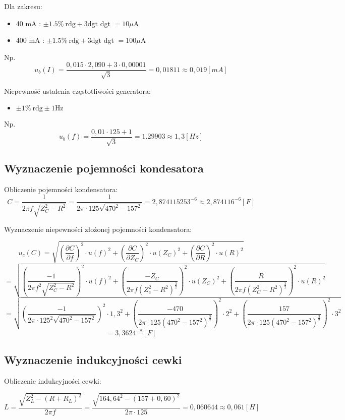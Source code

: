 \documentclass[12pt]{article}
\newcommand{\dpartial}[2]{\frac{\partial #1}{\partial #2}}
\newcommand{\physdpartial}[2]{\left( \dpartial{#1}{#2} \right)^2}
\newcommand{\powfrac}[2]{\left( \frac{#1}{#2} \right)^2}
\newcommand{\powsq}[1]{\left( #1 \right)^{\frac{3}{2}}}
\begin{document}
Dla zakresu:
\begin{itemize}
    \item 40 mA : $ \pm 1.5\% \ \textrm{rdg} + 3\textrm{dgt} $ \quad dgt $=10\mu$A
    \item 400 mA : $ \pm 1.5\% \ \textrm{rdg} + 3\textrm{dgt} $ \quad dgt $=100\mu$A
\end{itemize}

Np. 
$$ u_b(I) = \frac{0,015 \cdot 2,090 + 3 \cdot 0,00001}{\sqrt3} = 0,01811 \approx 0,019[mA]$$\bigskip

Niepewność ustalenia częstotliwości generatora:
\begin{itemize}
    \item $ \pm 1\% \ \textrm{rdg} \pm 1 \textrm{Hz} $
\end{itemize}

Np.
$$ u_b(f) = \frac{0,01 \cdot 125 + 1}{\sqrt{3}} = 1.29903 \approx 1,3[Hz] $$ 

\subsection{Wyznaczenie pojemności kondesatora}

Obliczenie pojemności kondensatora:
$$ C = \frac{1}{2 \pi f \sqrt{Z_C^2 - R^2}} = \frac{1}{2 \pi \cdot 125 \sqrt{470^2 - 157^2}} = 2,874115253^{-6} \approx 2,874116^{-6}[F] $$

Wyznaczenie niepewności złożonej pojemności kondensatora:

$$ u_c(C) = \sqrt{ \physdpartial{C}{f} \cdot u(f)^2 + \physdpartial{C}{Z_C} \cdot u(Z_C)^2 + \physdpartial{C}{R} \cdot u(R)^2 } $$
$$ = \sqrt{ \powfrac{-1}{2 \pi f^2 \sqrt{Z_C^2 - R^2}} \cdot u(f)^2 + \powfrac{-Z_C}{2 \pi f \powsq{Z_c^2 - R^2} } \cdot u(Z_C)^2 + \powfrac{R}{2 \pi f \powsq{Z_C^2 - R^2}} \cdot u(R)^2 } $$
$$ = \sqrt{ \powfrac{-1}{2 \pi \cdot 125^2 \sqrt{470^2 - 157^2}} \cdot 1,3^2 + \powfrac{-470}{2 \pi \cdot 125 \powsq{470^2 - 157^2} } \cdot 2^2 + \powfrac{157}{2\pi \cdot 125 \powsq{470^2 - 157^2} } \cdot 3^2 } $$
$$ = 3,3624^{-8}[F] $$

\subsection{Wyznaczenie indukcyjności cewki}

Obliczenie indukcyjności cewki:

$$ L = \frac{ \sqrt{Z_L^2 - (R + R_L)^2} }{2 \pi f} = \frac{ \sqrt{ 164,64^2 - (157 + 0,60)^2 }}{2 \pi \cdot 125} = 0,060644 \approx 0,061[H] $$
\end{document}
